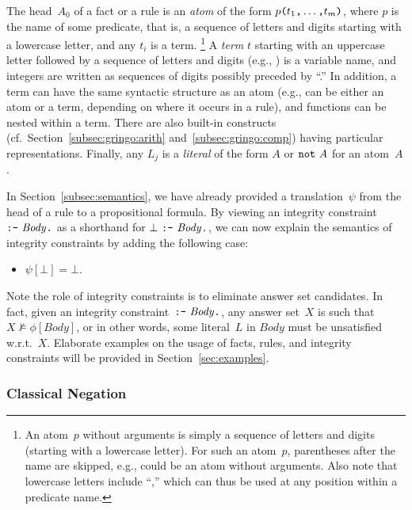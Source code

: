 \noindent
The head~$A_0$ of a fact or a rule is an \emph{atom} of the form
$p\texttt{(}t_1\texttt{,}\dots\texttt{,}t_m\texttt{)}$,
where $p$ is the name of some predicate, that is, a sequence of letters and digits
starting with a lowercase letter,
and any $t_i$ is a term.%
\footnote{An atom~$p$ without arguments is simply a sequence of letters and digits
  (starting with a lowercase letter).
  For such an atom~$p$, parentheses after the name are skipped, e.g.,
   could be an atom without arguments.
  Also note that lowercase letters include ``\code{\mus},''
  which can thus be used at any position within a predicate name.}
A \emph{term} $t$ starting with an uppercase letter followed by
a sequence of letters and digits (e.g., ) is a variable name,
and integers are written as sequences of digits possibly preceded by ``\code{-}.''
In addition, a term can have the same syntactic structure as an atom
(e.g., 
 can be either an atom or a term, depending on where it occurs in a rule),
and functions can be nested within a term.
There are also built-in constructs
(cf.\ Section~\ref{subsec:gringo:arith} and~\ref{subsec:gringo:comp})
having particular representations.
Finally, any $L_j$ is a \emph{literal} of the form $A$ or $\texttt{not}~A$
for an atom~$A$.

In Section~\ref{subsec:semantics},
we have already provided a translation~$\psi$
from the head of a rule to a propositional formula.
By viewing an integrity constraint
$\texttt{:-}~\mathit{Body}\texttt{.}$ as a shorthand for $\bot~\texttt{:-}~\mathit{Body}\texttt{.}$,
we can now explain the semantics of integrity constraints by adding the following case:
\begin{itemize}
\item $\psi[\bot]=\bot$.
\end{itemize}
Note the role of integrity constraints is to eliminate answer set candidates.
In fact, given an integrity constraint~$\texttt{:-}~\mathit{Body}\texttt{.}$,
any answer set~$X$ is such that $X\not\models\phi[\mathit{Body}]$, or
in other words, some literal~$L$ in $\mathit{Body}$ must be unsatisfied w.r.t.~$X$.
Elaborate examples on the usage of facts, rules, and integrity constraints
will be provided in Section~\ref{sec:examples}.


\subsubsection{Classical Negation}\label{subsec:gringo:negation}

